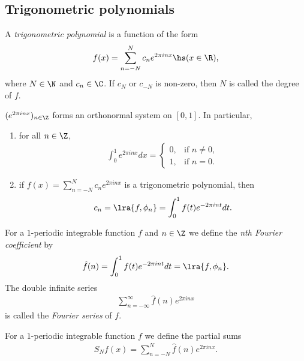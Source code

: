 \documentclass{article}
\begin{document}
\subsection{Trigonometric polynomials}

\begin{definition}
    A \emph{trigonometric polynomial} is a function of the form 
    \begin{align*}
        f(x) = \sum_{n=-N}^N c_ne^{2\pi i n x} \hs (x\in\R),
    \end{align*}
    where $N\in\N$ and $c_n\in\C$. If $c_N$ or $c_{-N}$ is non-zero, then $N$ is called the 
    degree of $f$.
\end{definition}

\begin{lemma}[Notes 5.1]
    $(e^{2\pi inx})_{n\in\Z}$ forms an orthonormal system on $[0,1]$. In particular,
    \begin{enumerate}
        \item for all $n\in\Z$, \begin{align*}
            \int_0^1 e^{2\pi inx}dx = \begin{cases}
                0, &\text{if }n\not=0,\\
                1, &\text{if }n=0.
            \end{cases}
        \end{align*}
        \item if $f(x)=\sum_{n=-N}^N c_ne^{2\pi inx}$ is a trigonometric polynomial, then \begin{align*}
            c_n = \lra{f,\phi_n} = \int_0^1 f(t)e^{-2\pi int}dt.
        \end{align*}
    \end{enumerate} 
\end{lemma}

\begin{definition}
    For a $1$-periodic integrable function $f$ and $n\in\Z$ we define the \emph{nth Fourier coefficient}
    by 
    \begin{align*}
        \hat f(n) = \int_0^1 f(t)e^{-2\pi int}dt=\lra{f, \phi_n}.
    \end{align*}
    The double infinite series 
    \begin{align*}
        \sum_{n=-\infty}^\infty \hat f(n) e^{2\pi inx}
    \end{align*}
    is called the \emph{Fourier series} of $f$.
\end{definition}

\begin{definition}
    For a $1$-periodic integrable function $f$ we define the partial sums
    \begin{align*}
        S_Nf(x)=\sum_{n=-N}^N \hat f(n) e^{2\pi inx}.
    \end{align*}
\end{definition}
\end{document}
